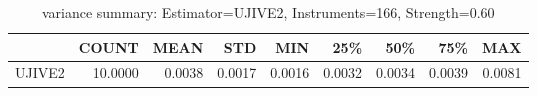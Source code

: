 \begin{table}[ht]
\centering
\caption{variance summary: Estimator=UJIVE2, Instruments=166, Strength=0.60}
\begin{tabular}{lrrrrrrrr}
\toprule
 & COUNT & MEAN & STD & MIN & 25\% & 50\% & 75\% & MAX \\
\midrule
UJIVE2 & 10.0000 & 0.0038 & 0.0017 & 0.0016 & 0.0032 & 0.0034 & 0.0039 & 0.0081 \\
\bottomrule
\end{tabular}
\end{table}
